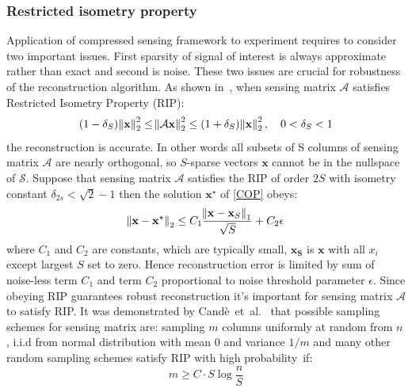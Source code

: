 \subsubsection{Restricted isometry property}
Application of compressed sensing framework to experiment requires to consider two important issues. 
First sparsity of signal of interest is always approximate rather than exact and second is noise. 
These two issues are crucial for robustness of the reconstruction algorithm. As shown in~\cite{Candes:2006fb}, when sensing matrix $\mathcal{A}$ satisfies Restricted Isometry Property (RIP):
\begin{equation}
	\left(1-\delta_S\right)\norm{\mathbf{x}}^2_2\leq\norm{\mathcal{A}\mathbf{x}}^2_2\leq\left(1+\delta_S\right)\norm{\mathbf{x}}^2_2, \quad 0 < \delta_S < 1
\end{equation}
the reconstruction is accurate. In other words all subsets of S columns of sensing matrix $\mathcal{A}$ are nearly orthogonal, so $S$-sparse vectors $\mathbf{x}$ cannot be in the nullspace of $\mathcal{S}$. 
Suppose that sensing matrix $\mathcal{A}$ satisfies the RIP of order $2S$ with isometry constant $\delta_{2s} < \sqrt{2} -1$ then the solution $\mathbf{x}^\star$ of \ref{COP} obeys:
\begin{equation}\label{Reconstruction error}
	\norm{\mathbf{x}-\mathbf{x}^\star}_2 \leq C_1 \frac{\norm{\mathbf{x}-\mathbf{x}_S}_1}{\sqrt{S}} + C_2 \epsilon
\end{equation}
where $C_1$ and $C_2$ are constants, which are typically small, $\mathbf{x_S}$ is $\mathbf{x}$ with all $x_i$ except largest $S$ set to zero. 
Hence reconstruction error is limited by sum of noise-less term $C_1$ and term $C_2$ proportional to noise threshold parameter $\epsilon$.
Since obeying RIP guarantees robust reconstruction \cite{Candes:2006fb} it's important for sensing matrix $\mathcal{A}$ to satisfy RIP. 
It was demonstrated by Cand{\`e}~et~al.~\cite{2008ISPM...25...21C} that possible sampling schemes for sensing matrix are: sampling $m$ columns uniformly at random from $n$, i.i.d from normal distribution with mean 0 and variance $1/m$ and many other random sampling schemes satisfy RIP with high probability~if:
\begin{equation}
	m\geq C \cdot S \log{\frac{n}{S}}
\end{equation}

